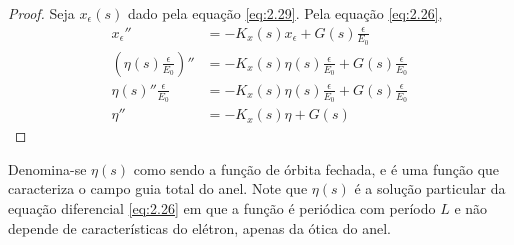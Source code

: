 \begin{proof}
	Seja $x_\epsilon(s)$ dado pela equação \eqref{eq:2.29}. Pela equação \eqref{eq:2.26},
	\begin{align*}
        x_\epsilon'' &= -K_x(s)x_\epsilon + G(s)\frac{\epsilon}{E_0}\\
        \left(\eta(s)\frac{\epsilon}{E_0}\right)'' &= -K_x(s)\eta(s)\frac{\epsilon}{E_0} + G(s)\frac{\epsilon}{E_0}\\
        \eta(s)''\frac{\epsilon}{E_0} &= -K_x(s)\eta(s)\frac{\epsilon}{E_0} + G(s)\frac{\epsilon}{E_0}\\
        \eta'' &= -K_x(s)\eta + G(s)
	\end{align*}
\end{proof}
	
Denomina-se $\eta(s)$ como sendo a função de órbita fechada, e é uma função que caracteriza o campo guia total do anel. Note que $\eta (s)$ é a solução particular da equação diferencial \eqref{eq:2.26} em que a função é periódica com período $L$ e não depende de características do elétron, apenas da ótica do anel.